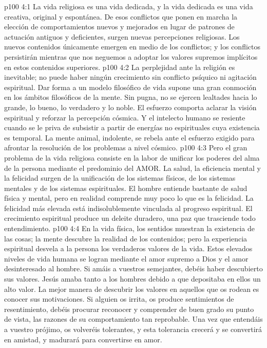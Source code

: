 \vs p100 4:1 La vida religiosa es una vida dedicada, y la vida dedicada es una vida creativa, original y espontánea. De esos conflictos que ponen en marcha la elección de comportamientos nuevos y mejorados en lugar de patrones de actuación antiguos y deficientes, surgen nuevas percepciones religiosas. Los nuevos contenidos únicamente emergen en medio de los conflictos; y los conflictos persistirán mientras que nos neguemos a adoptar los valores supremos implícitos en estos contenidos superiores.
\vs p100 4:2 La perplejidad ante la religión es inevitable; no puede haber ningún crecimiento sin conflicto psíquico ni agitación espiritual. Dar forma a un modelo filosófico de vida supone una gran conmoción en los ámbitos filosóficos de la mente. Sin pugna, no se ejercen lealtades hacia lo grande, lo bueno, lo verdadero y lo noble. El esfuerzo comporta aclarar la visión espiritual y reforzar la percepción cósmica. Y el intelecto humano se resiente cuando se le priva de subsistir a partir de energías no espirituales cuya existencia es temporal. La mente animal, indolente, se rebela ante el esfuerzo exigido para afrontar la resolución de los problemas a nivel cósmico.
\vs p100 4:3 Pero el gran problema de la vida religiosa consiste en la labor de unificar los poderes del alma de la persona mediante el predominio del AMOR. La salud, la eficiencia mental y la felicidad surgen de la unificación de los sistemas físicos, de los sistemas mentales y de los sistemas espirituales. El hombre entiende bastante de salud física y mental, pero en realidad comprende muy poco lo que es la felicidad. La felicidad más elevada está indisolublemente vinculada al progreso espiritual. El crecimiento espiritual produce un deleite duradero, una paz que trasciende todo entendimiento.
\vs p100 4:4 \pc En la vida física, los sentidos muestran la existencia de las cosas; la mente descubre la realidad de los contenidos; pero la experiencia espiritual desvela a la persona los verdaderos valores de la vida. Estos elevados niveles de vida humana se logran mediante el amor supremo a Dios y el amor desinteresado al hombre. Si amáis a vuestros semejantes, debéis haber descubierto sus valores. Jesús amaba tanto a los hombres debido a que depositaba en ellos un alto valor. La mejor manera de descubrir los valores en aquellos que os rodean es conocer sus motivaciones. Si alguien os irrita, os produce sentimientos de resentimiento, debéis procurar reconocer y comprender de buen grado su punto de vista, las razones de su comportamiento tan reprobable. Una vez que entendáis a vuestro prójimo, os volveréis tolerantes, y esta tolerancia crecerá y se convertirá en amistad, y madurará para convertirse en amor.
